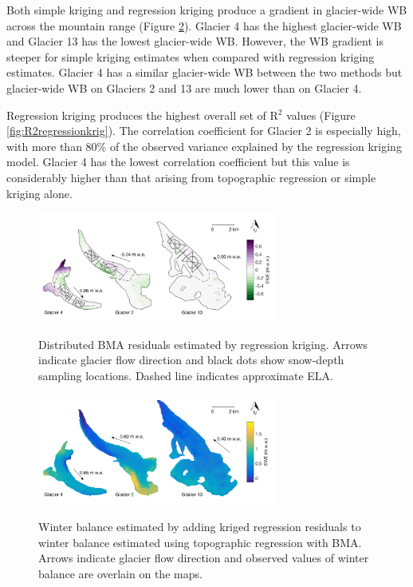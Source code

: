 \documentclass[onecolumn, letterpaper]{igs}
\newcommand{\topomap}{Arrows indicate glacier flow direction and black dots show snow-depth sampling locations. }
\newcommand{\swedots}{Arrows indicate glacier flow direction and observed values of winter balance are overlain on the maps. }
\begin{document}
Both simple kriging and regression kriging produce a gradient in glacier-wide WB across the mountain range (Figure \ref{fig:Regression-Kriging}). Glacier 4 has the highest glacier-wide WB and Glacier 13 has the lowest glacier-wide WB. However, the WB gradient is steeper for simple kriging estimates when compared with regression kriging estimates. Glacier 4 has a similar glacier-wide WB between the two methods but glacier-wide WB on Glaciers 2 and 13 are much lower than on Glacier 4.  

Regression kriging produces the highest overall set of R$^2$ values (Figure \ref{fig:R2regressionkrig}). The correlation coefficient for Glacier 2 is especially high, with more than 80\% of the observed variance explained by the regression kriging model. Glacier 4 has the lowest correlation coefficient but this value is considerably higher than that arising from topographic regression or simple kriging alone. 

\begin{figure}
	\centering
	\includegraphics[width = 0.7\textwidth]{residualsKriged.png}\\
	\caption[Distributed BMA residuals estimated by regression kriging]{Distributed BMA residuals estimated by regression kriging. \topomap Dashed line indicates approximate ELA.}
	\label{fig:residualsKRIGING}
\end{figure}

\begin{figure}
	\centering
	\includegraphics[width = 0.7\textwidth]{RegressionKriging.png}\\
	\caption[Winter balance estimated by adding kriged regression residuals to winter balance estimated using topographic regression with BMA]{Winter balance estimated by adding kriged regression residuals to winter balance estimated using topographic regression with BMA. \swedots}
	\label{fig:Regression-Kriging}
\end{figure}
\end{document}
